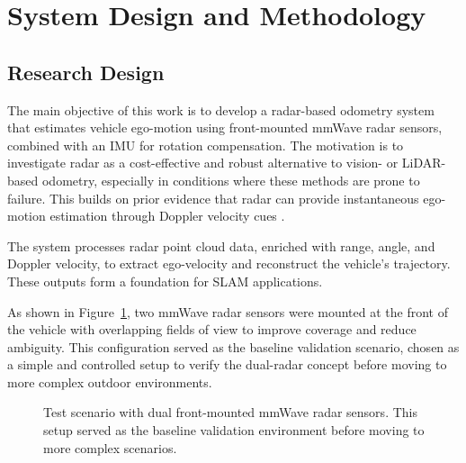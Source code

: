 \section{System Design and Methodology}
\subsection{Research Design}

The main objective of this work is to develop a radar-based odometry system that estimates vehicle ego-motion using front-mounted mmWave radar sensors, combined with an IMU for rotation compensation.  
The motivation is to investigate radar as a cost-effective and robust alternative to vision- or LiDAR-based odometry, especially in conditions where these methods are prone to failure.  
This builds on prior evidence that radar can provide instantaneous ego-motion estimation through Doppler velocity cues \cite{EgoMotion_DopplerRadar}.  

The system processes radar point cloud data, enriched with range, angle, and Doppler velocity, to extract ego-velocity and reconstruct the vehicle’s trajectory.  
These outputs form a foundation for SLAM applications.  

As shown in Figure~\ref{fig:test_scenario}, two mmWave radar sensors were mounted at the front of the vehicle with overlapping fields of view to improve coverage and reduce ambiguity.  
This configuration served as the baseline validation scenario, chosen as a simple and controlled setup to verify the dual-radar concept before moving to more complex outdoor environments.  

\begin{figure}[!htbp]
    \centering
    \caption{Test scenario with dual front-mounted mmWave radar sensors.  
    This setup served as the baseline validation environment before moving to more complex scenarios.}
    \label{fig:test_scenario}
\end{figure}

